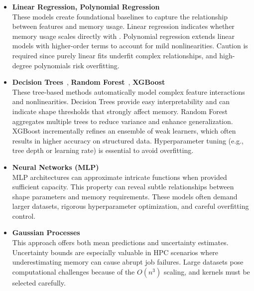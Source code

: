 \begin{itemize}
    \item \textbf{Linear Regression, Polynomial Regression}~\cite{hastie2009elements}\\
    These models create foundational baselines to capture the relationship between features and memory usage.
    Linear regression indicates whether memory usage scales directly with .
    Polynomial regression extends linear models with higher-order terms to account for mild nonlinearities.
    Caution is required since purely linear fits underfit complex relationships, and high-degree polynomials risk overfitting.

    \item \textbf{Decision Trees}~\cite{breiman1984classification}, \textbf{Random Forest}~\cite{breiman2001random}, \textbf{\ac{XGBoost}}~\cite{chen2016xgboost}\\
    These tree-based methods automatically model complex feature interactions and nonlinearities.
    Decision Trees provide easy interpretability and can indicate shape thresholds that strongly affect memory.
    Random Forest aggregates multiple trees to reduce variance and enhance generalization.
    \ac{XGBoost} incrementally refines an ensemble of weak learners, which often results in higher accuracy on structured data.
    Hyperparameter tuning (e.g., tree depth or learning rate) is essential to avoid overfitting. 

    \item \textbf{Neural Networks (\ac{MLP})}~\cite{rumelhart1986learning}\\
    \ac{MLP} architectures can approximate intricate functions when provided sufficient capacity.
    This property can reveal subtle relationships between shape parameters and memory requirements.
    These models often demand larger datasets, rigorous hyperparameter optimization, and careful overfitting control. 

    \item \textbf{Gaussian Processes}~\cite{rasmussen2006gaussian}\\
    This approach offers both mean predictions and uncertainty estimates.
    Uncertainty bounds are especially valuable in \ac{HPC} scenarios where underestimating memory can cause abrupt job failures.
    Large datasets pose computational challenges because of the \(O(n^3)\) scaling, and kernels must be selected carefully. 


\end{itemize}
